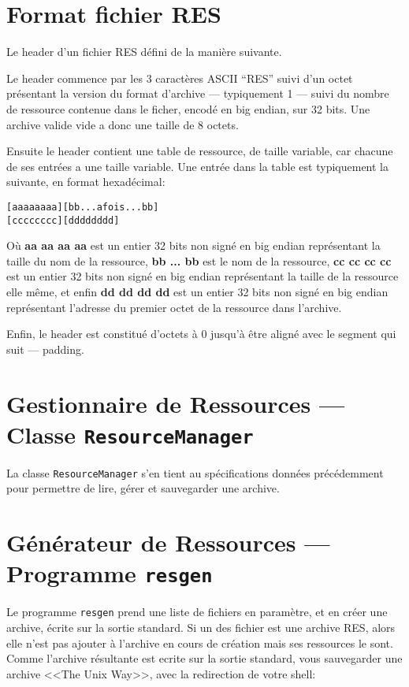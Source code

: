 \documentclass[pdftex, 11pt, a4paper, titlepage]{article}
\begin{document}
\pagebreak

\section{Format fichier RES}

Le header d'un fichier RES défini de la manière suivante.

Le header commence par les 3 caractères ASCII ``RES'' suivi d'un octet
présentant la version du format d'archive --- typiquement 1 --- suivi
du nombre de ressource contenue dans le ficher, encodé en big endian,
sur 32 bits.  Une archive valide vide a donc une taille de 8 octets.

Ensuite le header contient une table de ressource, de taille variable,
car chacune de ses entrées a une taille variable.  Une entrée dans la
table est typiquement la suivante, en format hexadécimal:

\begin{alltt}
[ aa aa aa aa ] [ bb {... a fois ...} bb]
[ cc cc cc cc] [ dd dd dd dd ]
\end{alltt}

Où \textbf{aa aa aa aa} est un entier 32 bits non signé en big endian
représentant la taille du nom de la ressource, \textbf{bb ... bb} est
le nom de la ressource, \textbf{cc cc cc cc} est un entier 32 bits non
signé en big endian représentant la taille de la ressource elle même,
et enfin \textbf{dd dd dd dd} est un entier 32 bits non signé en big
endian représentant l'adresse du premier octet de la ressource dans
l'archive.

Enfin, le header est constitué d'octets à 0 jusqu'à être aligné avec
le segment qui suit --- padding.

\section{Gestionnaire de Ressources --- Classe
  \texttt{ResourceManager}}

La classe \texttt{ResourceManager} s'en tient au spécifications
données précédemment pour permettre de lire, gérer et sauvegarder une
archive.

\section{Générateur de Ressources --- Programme \texttt{resgen}}

Le programme \texttt{resgen} prend une liste de fichiers en paramètre,
et en créer une archive, écrite sur la sortie standard.  Si un des
fichier est une archive RES, alors elle n'est pas ajouter à l'archive
en cours de création mais ses ressources le sont.  Comme l'archive
résultante est ecrite sur la sortie standard, vous sauvegarder une
archive <<The Unix Way>>, avec la redirection de votre shell:
 
\end{document}
